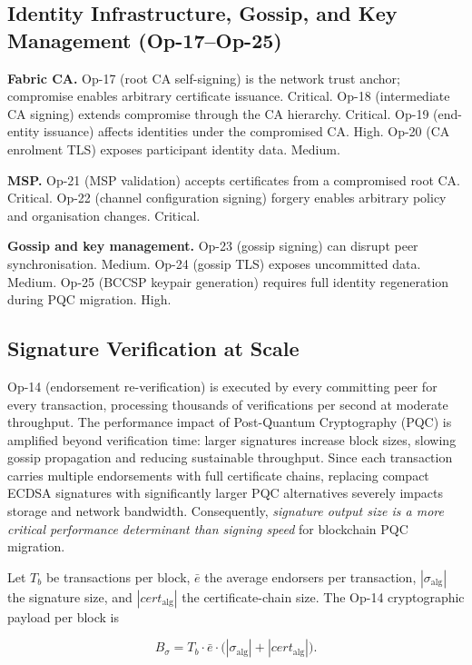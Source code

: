 \documentclass[conference]{IEEEtran}
\begin{document}
\subsection{Identity Infrastructure, Gossip, and Key Management (Op-17--Op-25)}
\textbf{Fabric CA.}
Op-17 (root CA self-signing) is the network trust anchor; compromise enables
arbitrary certificate issuance. Critical. Op-18 (intermediate CA signing)
extends compromise through the CA hierarchy. Critical. Op-19 (end-entity
issuance) affects identities under the compromised CA. High. Op-20 (CA
enrolment TLS) exposes participant identity data. Medium.

\textbf{MSP.}
Op-21 (MSP validation) accepts certificates from a compromised root CA.
Critical. Op-22 (channel configuration signing) forgery enables arbitrary
policy and organisation changes. Critical.

\textbf{Gossip and key management.}
Op-23 (gossip signing) can disrupt peer synchronisation. Medium. Op-24
(gossip TLS) exposes uncommitted data. Medium. Op-25 (BCCSP keypair generation)
requires full identity regeneration during PQC migration. High.

\subsection{Signature Verification at Scale}
\label{sec:tm_scale}
Op-14 (endorsement re-verification) is executed by every committing peer for every transaction, processing thousands of verifications per second at moderate throughput. The performance impact of Post-Quantum Cryptography (PQC) is amplified beyond verification time: larger signatures increase block sizes, slowing gossip propagation and reducing sustainable throughput. Since each transaction carries multiple endorsements with full certificate chains, replacing compact ECDSA signatures with significantly larger PQC alternatives severely impacts storage and network bandwidth. Consequently, \emph{signature output size is a more critical performance determinant than signing speed} for blockchain PQC migration.

Let $T_b$ be transactions per block, $\bar{e}$ the average endorsers per
transaction, $|\sigma_{\mathrm{alg}}|$ the signature size, and
$|\mathit{cert}_{\mathrm{alg}}|$ the certificate-chain size. The Op-14
cryptographic payload per block is

\begin{equation}
B_{\sigma} = T_b \cdot \bar{e} \cdot
\bigl(|\sigma_{\mathrm{alg}}| + |\mathit{cert}_{\mathrm{alg}}|\bigr).
\label{eq:block_payload}
\end{equation}
\end{document}
